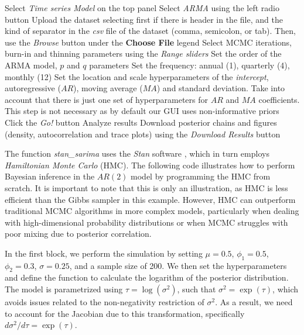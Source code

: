 \begin{algorithm}[h!]
	\caption{Autoregressive Moving Average ($ARMA$) models}\label{alg:ARMA}
	\begin{algorithmic}[1]  		 			
		\State Select \textit{Time series Model} on the top panel
		\State Select \textit{ARMA} using the left radio button
		\State Upload the dataset selecting first if there is header in the file, and the kind of separator in the \textit{csv} file of the dataset (comma, semicolon, or tab). Then, use the \textit{Browse} button under the \textbf{Choose File} legend
		\State Select MCMC iterations, burn-in and thinning parameters using the \textit{Range sliders}
		\State Set the order of the ARMA model, $p$ and $q$ parameters
		\State Set the frequency: annual (1), quarterly (4), monthly (12)
		\State Set the location and scale hyperparameters of the \textit{intercept}, autoregressive ($AR$), moving average ($MA$) and standard deviation. Take into account that there is just one set of hyperparameters for $AR$ and $MA$ coefficients. This step is not necessary as by default our GUI uses non-informative priors
		\State Click the \textit{Go!} button
		\State Analyze results
		\State Download posterior chains and figures (density, autocorrelation and trace plots) using the \textit{Download Results} button
	\end{algorithmic} 
\end{algorithm}

The function \textit{stan\_sarima} uses the \textit{Stan} software \cite{Stan2024}, which in turn employs \textit{Hamiltonian Monte Carlo} (HMC). The following code illustrates how to perform Bayesian inference in the $AR(2)$ model by programming the HMC from scratch. It is important to note that this is only an illustration, as HMC is less efficient than the Gibbs sampler in this example. However, HMC can outperform traditional MCMC algorithms in more complex models, particularly when dealing with high-dimensional probability distributions or when MCMC struggles with poor mixing due to posterior correlation.

In the first block, we perform the simulation by setting $\mu=0.5$, $\phi_1=0.5$, $\phi_2=0.3$, $\sigma=0.25$, and a sample size of 200. We then set the hyperparameters and define the function to calculate the logarithm of the posterior distribution. The model is parametrized using $\tau = \log(\sigma^2)$, such that $\sigma^2=\exp(\tau)$, which avoids issues related to the non-negativity restriction of $\sigma^2$. As a result, we need to account for the Jacobian due to this transformation, specifically $d\sigma^2/d\tau = \exp(\tau)$.

